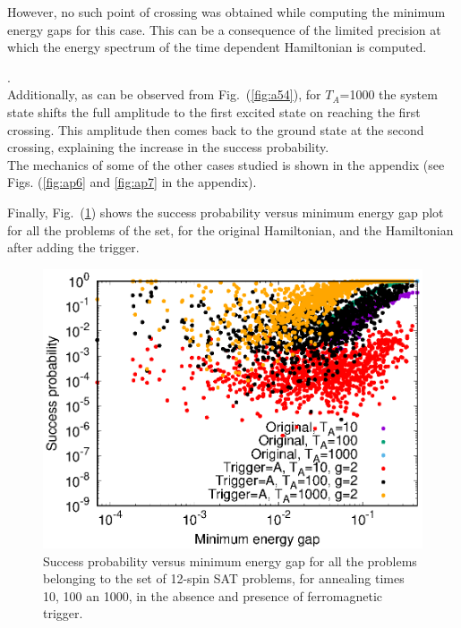 \documentclass[../main.tex]{subfiles}
\begin{document}
However, no such point of crossing was obtained while computing the minimum energy gaps for this case. This can be a consequence of the limited precision at which the energy spectrum of the time dependent Hamiltonian is computed. .\\

Additionally, as can be observed from Fig.~(\ref{fig:a54}), for $T_A$=1000 the system state shifts the full amplitude to the first excited state on reaching the first crossing. This amplitude then comes back to the ground state at the second crossing, explaining the increase in the success probability.\\
The mechanics of some of the other cases studied is shown in the appendix (see Figs. (\ref{fig:ap6} and \ref{fig:ap7} in the appendix).

Finally, Fig.~(\ref{fig:a46}) shows the success probability versus minimum energy gap plot for all the problems of the set, for the original Hamiltonian, and the Hamiltonian after adding the trigger. 

\begin{figure}
\centering 
\includegraphics[scale=0.8 ]{SuccVsGap_OA_g2.eps}
\caption{Success probability versus minimum energy gap for all the problems belonging to the set of 12-spin SAT problems, for annealing times 10, 100 an 1000, in the absence and presence of ferromagnetic trigger.}
\label{fig:a46}
\end{figure}
\end{document}

